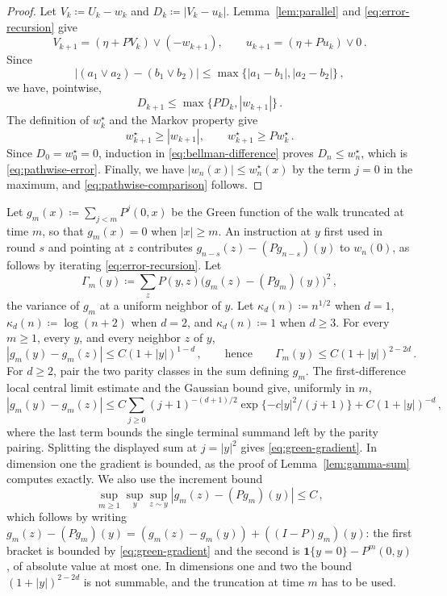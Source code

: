 \documentclass[11pt]{amsart}
\theoremstyle{plain}
\theoremstyle{definition}
\newcommand{\one}{\mathbf{1}}
\begin{document}
\begin{proof}
	Let $V_k\coloneqq U_k-w_k$ and $D_k\coloneqq|V_k-u_k|$. Lemma~\ref{lem:parallel} and
	\eqref{eq:error-recursion} give
	\[
		V_{k+1}=(\eta+PV_k)\vee(-w_{k+1}),
		\qquad
		u_{k+1}=(\eta+Pu_k)\vee0\,.
	\]
	Since
	\[
		|(a_1\vee a_2)-(b_1\vee b_2)|
		\leq\max\{|a_1-b_1|,|a_2-b_2|\}\,,
	\]
	we have, pointwise,
	\begin{equation}\label{eq:bellman-difference}
		D_{k+1}\leq\max\{PD_k,|w_{k+1}|\}\,.
	\end{equation}
	The definition of $w_k^\star$ and the Markov property give
	\[
		w_{k+1}^\star\geq|w_{k+1}|,
		\qquad
		w_{k+1}^\star\geq Pw_k^\star\,.
	\]
	Since $D_0=w_0^\star=0$, induction in
	\eqref{eq:bellman-difference} proves $D_n\leq w_n^\star$, which is
	\eqref{eq:pathwise-error}. Finally, we have
	$|w_n(x)|\leq w_n^\star(x)$ by the term $j=0$ in the maximum, and
	\eqref{eq:pathwise-comparison} follows.
\end{proof}

Let $g_m(x)\coloneqq\sum_{j<m}P^j(0,x)$ be the Green function of the walk truncated
at time $m$, so that $g_m(x)=0$ when $|x|\geq m$. An instruction at $y$ first
used in round $s$ and pointing at $z$ contributes
$g_{n-s}(z)-(Pg_{n-s})(y)$ to $w_n(0)$, as follows by iterating
\eqref{eq:error-recursion}. Let
\[
\Gamma_m(y)\coloneqq\sum_zP(y,z)\bigl(g_m(z)-(Pg_m)(y)\bigr)^2\,,
\]
the variance of $g_m$ at a uniform neighbor of $y$. Let
$\kappa_d(n)\coloneqq n^{1/2}$ when $d=1$,
$\kappa_d(n)\coloneqq\log(n+2)$ when $d=2$, and
$\kappa_d(n)\coloneqq1$ when $d\geq3$.
For every $m\geq1$, every $y$, and every neighbor $z$ of $y$,
\begin{equation}\label{eq:green-gradient}
	|g_m(y)-g_m(z)|\leq C(1+|y|)^{1-d}\,,
	\qquad\text{hence}\qquad
	\Gamma_m(y)\leq C(1+|y|)^{2-2d}\,.
\end{equation}
For $d\geq2$, pair the two parity classes in the sum defining $g_m$. The
first-difference local central limit estimate and the Gaussian bound
\citep[Section~2.3]{LawlerLimic} give, uniformly in $m$,
\[
	|g_m(y)-g_m(z)|
	\leq C\sum_{j\geq0}(j+1)^{-(d+1)/2}
	\exp\{-c|y|^2/(j+1)\}+C(1+|y|)^{-d}\,,
\]
where the last term bounds the single terminal summand left by the parity
pairing. Splitting the displayed sum at $j=|y|^2$ gives
\eqref{eq:green-gradient}. In dimension one the gradient is
bounded, as the proof of Lemma~\ref{lem:gamma-sum} computes exactly. We also use the increment bound
\begin{equation}\label{eq:increment}
	\sup_{m\geq1}\sup_y\sup_{z\sim y}|g_m(z)-(Pg_m)(y)|\leq C\,,
\end{equation}
which follows by writing
$g_m(z)-(Pg_m)(y)=(g_m(z)-g_m(y))+((I-P)g_m)(y)$: the first bracket is bounded
by \eqref{eq:green-gradient} and the second is
$\one\{y=0\}-P^m(0,y)$, of absolute value at most one. In dimensions one and
two the bound $(1+|y|)^{2-2d}$ is not summable, and the truncation at time $m$
has to be used.
\end{document}
